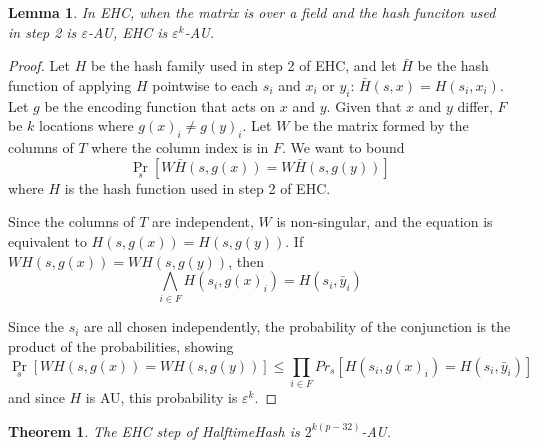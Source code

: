 \documentclass[sigconf, nonacm]{acmart}
\newtheorem{theorem}{Theorem}
\newtheorem*{lemma}{Lemma}
\begin{document}
\begin{lemma}
  In EHC, when the matrix is over a field and the hash funciton used in step 2 is $\varepsilon$-AU, EHC is $\varepsilon^k$-AU.
\end{lemma}
\begin{proof}
  Let $H$ be the hash family used in step 2 of EHC, and let $\bar{H}$ be the hash function of applying $H$ pointwise to each $s_i$ and $x_i$ or $y_i$: $\bar{H}(s, x) = H(s_i, x_i)$.
  Let $g$ be the encoding function that acts on $x$ and $y$.
  Given that $x$ and $y$ differ, $F$ be $k$ locations where $g(x)_i \neq g(y)_i$.
  Let $W$ be the matrix formed by the columns of $T$ where the column index is in $F$.
  We want to bound
  \begin{equation}
    \label{ehc-delta}
    \Pr_s[W \bar{H}(s, g(x)) = W \bar{H}(s, g(y))]
  \end{equation}
  where $H$ is the hash function used in step 2 of EHC.

  Since the columns of $T$ are independent, $W$ is non-singular, and the equation is equivalent to $H(s, g(x)) = H(s, g(y))$.
  If $W H(s, g(x)) = W H(s, g(y))$, then
  \[
  \bigwedge_{i \in F} H(s_i, g(x)_i) = H(s_i, \bar{y}_i)
  \]

  Since the $s_i$ are all chosen independently, the probability of the conjunction is the product of the probabilities, showing
  \[
  \Pr_s[W H(s,g(x)) = W H(s,g(y))] \leq \prod_{i \in F} Pr_s[H(s_i, g(x)_i) = H(s_i, \bar{y}_i)]
  \]
  and since $H$ is AU, this probability is $\varepsilon^k$.
\end{proof}

\begin{theorem}
  The EHC step of HalftimeHash is $2^{k(p-32)}$-AU.
\end{theorem}
\end{document}
